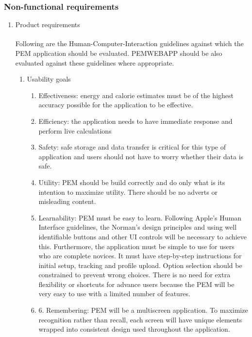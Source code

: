 \documentclass[12pt, a4paper]{report}   %
\begin{document}
\begin{enumerate}
\subsubsection{Non-functional requirements}

\begin{enumerate}
	\item Product requirements\\ \\
	Following are the Human-Computer-Interaction guidelines against which the PEM application should be evaluated. PEMWEBAPP should be also evaluated against these guidelines where appropriate.\\
	\begin{enumerate}
		\item Usability goals
		\begin {enumerate}
			\item Effectiveness: energy and calorie estimates must be of the highest accuracy possible for the application to be effective.
			\item Efficiency: the application needs to have immediate response and perform live calculations 
			\item Safety: safe storage and data transfer is critical for this type of application and users should not have to worry whether their data is safe.
			\item Utility: PEM should be build correctly and do only what is its intention to maximize utility. There should be no adverts or misleading content.
			\item Learnability: PEM must be easy to learn. Following Apple's Human Interface guidelines, the Norman's design principles and using well identifiable buttons and other UI controls will be necessary to achieve this. Furthermore, the application must be simple to use for users who are complete novices. It must have step-by-step instructions for initial setup, tracking and profile upload. Option selection should be constrained to prevent wrong choices. There is no need for extra flexibility or shortcuts for advance users because the PEM will be very easy to use with a limited number of features.
			\item 6. Remembering: PEM will be a multiscreen application. To maximize recognition rather than recall, each screen will have unique elements wrapped into consistent design used throughout the application.\\
		\end{enumerate}


\end{enumerate}
\end{enumerate}
\end{enumerate}
\end{document}
